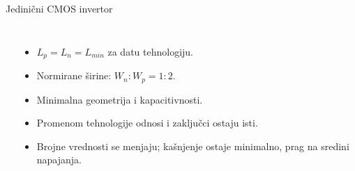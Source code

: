 \begin{frame}[label=09_3-s013]{Jedinični CMOS invertor}
\begin{columns}[c,onlytextwidth]
\begin{center}

\end{center}
\begin{itemize}
\item $L_p=L_n=L_{min}$ za datu tehnologiju.
\item Normirane širine: $W_n:W_p=1:2$.
\item Minimalna geometrija i kapacitivnosti.
\item Promenom tehnologije odnosi i zaključci ostaju isti.
\item Brojne vrednosti se menjaju; kašnjenje ostaje minimalno, prag na sredini napajanja.
\end{itemize}
\end{columns}
\end{frame}
